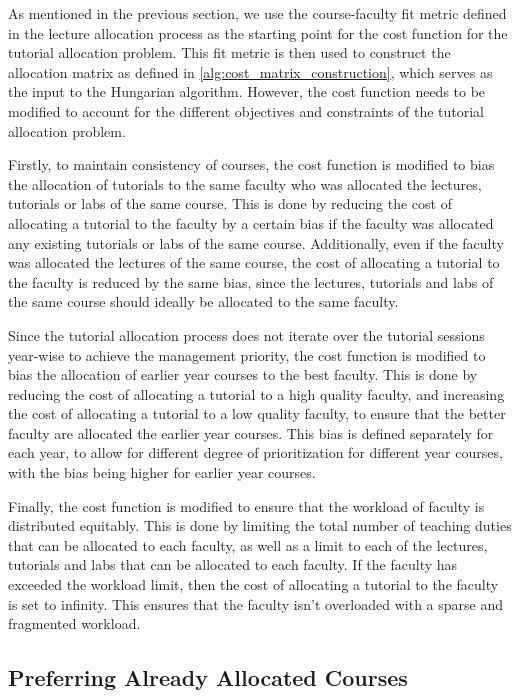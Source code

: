 As mentioned in the previous section, we use the course-faculty fit metric defined in the lecture allocation process as the starting point for the cost function for the tutorial allocation problem. This fit metric is then used to construct the allocation matrix as defined in \autoref{alg:cost_matrix_construction}, which serves as the input to the Hungarian algorithm. However, the cost function needs to be modified to account for the different objectives and constraints of the tutorial allocation problem.

Firstly, to maintain consistency of courses, the cost function is modified to bias the allocation of tutorials to the same faculty who was allocated the lectures, tutorials or labs of the same course. This is done by reducing the cost of allocating a tutorial to the faculty by a certain bias if the faculty was allocated any existing tutorials or labs of the same course. Additionally, even if the faculty was allocated the lectures of the same course, the cost of allocating a tutorial to the faculty is reduced by the same bias, since the lectures, tutorials and labs of the same course should ideally be allocated to the same faculty.

Since the tutorial allocation process does not iterate over the tutorial sessions year-wise to achieve the management priority, the cost function is modified to bias the allocation of earlier year courses to the best faculty. This is done by reducing the cost of allocating a tutorial to a high quality faculty, and increasing the cost of allocating a tutorial to a low quality faculty, to ensure that the better faculty are allocated the earlier year courses. This bias is defined separately for each year, to allow for different degree of prioritization for different year courses, with the bias being higher for earlier year courses.

Finally, the cost function is modified to ensure that the workload of faculty is distributed equitably. This is done by limiting the total number of teaching duties that can be allocated to each faculty, as well as a limit to each of the lectures, tutorials and labs that can be allocated to each faculty. If the faculty has exceeded the workload limit, then the cost of allocating a tutorial to the faculty is set to infinity. This ensures that the faculty isn't overloaded with a sparse and fragmented workload.

\subsection{Preferring Already Allocated Courses}

